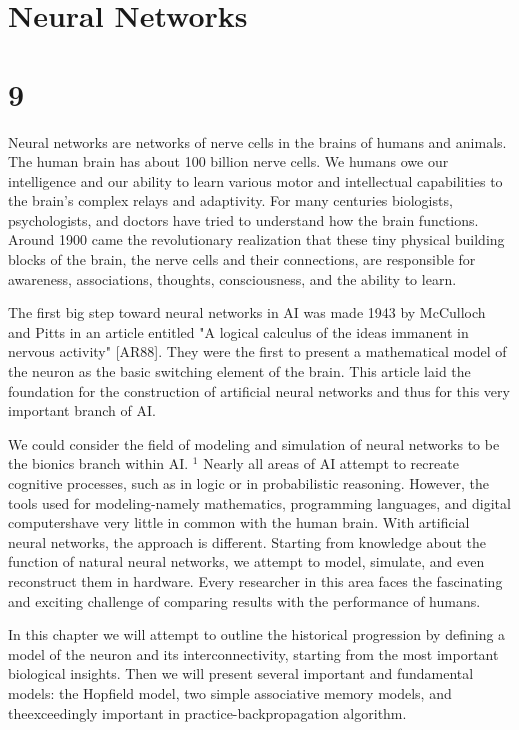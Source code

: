 \documentclass[10pt]{article}
\begin{document}
\section*{Neural Networks}
\section*{9}
Neural networks are networks of nerve cells in the brains of humans and animals. The human brain has about 100 billion nerve cells. We humans owe our intelligence and our ability to learn various motor and intellectual capabilities to the brain's complex relays and adaptivity. For many centuries biologists, psychologists, and doctors have tried to understand how the brain functions. Around 1900 came the revolutionary realization that these tiny physical building blocks of the brain, the nerve cells and their connections, are responsible for awareness, associations, thoughts, consciousness, and the ability to learn.

The first big step toward neural networks in AI was made 1943 by McCulloch and Pitts in an article entitled "A logical calculus of the ideas immanent in nervous activity" [AR88]. They were the first to present a mathematical model of the neuron as the basic switching element of the brain. This article laid the foundation for the construction of artificial neural networks and thus for this very important branch of AI.

We could consider the field of modeling and simulation of neural networks to be the bionics branch within AI. ${ }^{1}$ Nearly all areas of AI attempt to recreate cognitive processes, such as in logic or in probabilistic reasoning. However, the tools used for modeling-namely mathematics, programming languages, and digital computershave very little in common with the human brain. With artificial neural networks, the approach is different. Starting from knowledge about the function of natural neural networks, we attempt to model, simulate, and even reconstruct them in hardware. Every researcher in this area faces the fascinating and exciting challenge of comparing results with the performance of humans.

In this chapter we will attempt to outline the historical progression by defining a model of the neuron and its interconnectivity, starting from the most important biological insights. Then we will present several important and fundamental models: the Hopfield model, two simple associative memory models, and theexceedingly important in practice-backpropagation algorithm.
\end{document}
